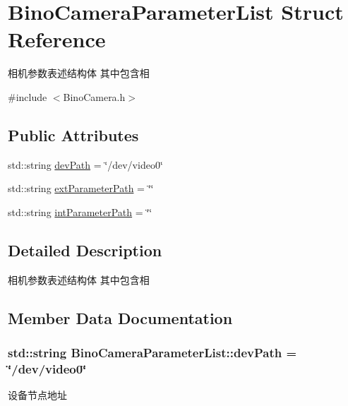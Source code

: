 \hypertarget{structBinoCameraParameterList}{}\section{Bino\+Camera\+Parameter\+List Struct Reference}
\label{structBinoCameraParameterList}


相机参数表述结构体 其中包含相  




{\ttfamily \#include $<$Bino\+Camera.\+h$>$}

\subsection*{Public Attributes}
\begin{DoxyCompactItemize}
\item 
std\+::string \hyperlink{structBinoCameraParameterList_a6548a47272da00ae1f2938911953a0c5}{dev\+Path} = \char`\"{}/dev/video0\char`\"{}
\item 
std\+::string \hyperlink{structBinoCameraParameterList_acc45b286726dc4f47ef631d905ddc8db}{ext\+Parameter\+Path} = \char`\"{}\char`\"{}
\item 
std\+::string \hyperlink{structBinoCameraParameterList_ad2c8ebe70a244b212608d2a549c74b4a}{int\+Parameter\+Path} = \char`\"{}\char`\"{}
\end{DoxyCompactItemize}


\subsection{Detailed Description}
相机参数表述结构体 其中包含相 

\subsection{Member Data Documentation}
\subsubsection[{\texorpdfstring{dev\+Path}{devPath}}]{\setlength{\rightskip}{0pt plus 5cm}std\+::string Bino\+Camera\+Parameter\+List\+::dev\+Path = \char`\"{}/dev/video0\char`\"{}}\hypertarget{structBinoCameraParameterList_a6548a47272da00ae1f2938911953a0c5}{}\label{structBinoCameraParameterList_a6548a47272da00ae1f2938911953a0c5}
设备节点地址 
